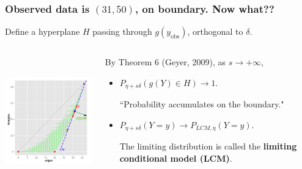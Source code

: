 \documentclass[slidestop,compress, 10pt]{beamer}
\DeclareMathOperator{\rint}{rint}
\newcommand{\yobs}{y_{\text{obs}}}
\begin{document}

\frame
{
	\frametitle{Observed data is $(31,50)$, on boundary.  Now what??}

Define a hyperplane $H$ passing through $g(\yobs)$, orthogonal to $\delta$.
\begin{columns}[]
\begin{column}[T]{0.45\textwidth}
\includegraphics[height=2.2in]{g9-H.png}
\end{column}
\begin{column}[t]{0.57\textwidth}

\pause
By Theorem 6 (Geyer, 2009), as $s \to +\infty$,
\vspace{1mm}
\begin{itemize}
\item $P_{\eta + s \delta}( g(Y) \in H) \to 1.$
\vspace{1mm}

``Probability accumulates on the boundary."
\vspace{1mm}

\pause
\item $P_{\eta + s \delta}( Y = y) \to P_{LCM, \eta}( Y = y)$.
\vspace{1mm}

The limiting distribution is called the \textbf{limiting conditional model (LCM)}.
\end{itemize}
\end{column}
\end{columns}
}
\end{document}
